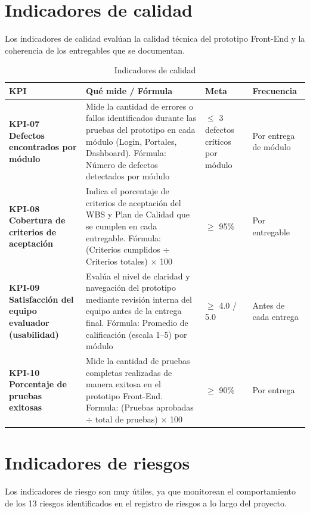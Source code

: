 \documentclass[11pt,spanish]{article}
\begin{document}
\section{Indicadores de calidad}

Los indicadores de calidad evalúan la calidad técnica del prototipo Front-End y la coherencia de los entregables que se documentan.

\begin{table}[H]
\centering
\small
\caption{Indicadores de calidad}\label{tab:indicadores-calidad}
\begin{tabularx}{\textwidth}{p{4.5cm} Y p{3cm} p{2.5cm}}
\toprule
\textbf{KPI} & \textbf{Qué mide / Fórmula} & \textbf{Meta} & \textbf{Frecuencia} \\
\midrule
\textbf{KPI-07 Defectos encontrados por módulo} & Mide la cantidad de errores o fallos identificados durante las pruebas del prototipo en cada módulo (Login, Portales, Dashboard). Fórmula: Número de defectos detectados por módulo & $\leq$ 3 defectos críticos por módulo & Por entrega de módulo \\
\textbf{KPI-08 Cobertura de criterios de aceptación} & Indica el porcentaje de criterios de aceptación del WBS y Plan de Calidad que se cumplen en cada entregable. Fórmula: (Criterios cumplidos $\div$ Criterios totales) $\times$ 100 & $\geq$ 95\% & Por entregable \\
\textbf{KPI-09 Satisfacción del equipo evaluador (usabilidad)} & Evalúa el nivel de claridad y navegación del prototipo mediante revisión interna del equipo antes de la entrega final. Fórmula: Promedio de calificación (escala 1--5) por módulo & $\geq$ 4.0 / 5.0 & Antes de cada entrega \\
\textbf{KPI-10 Porcentaje de pruebas exitosas} & Mide la cantidad de pruebas completas realizadas de manera exitosa en el prototipo Front-End. Formula: (Pruebas aprobadas $\div$ total de pruebas) $\times$ 100 & $\geq$ 90\% & Por entrega \\
\bottomrule
\end{tabularx}
\end{table}

\section{Indicadores de riesgos}

Los indicadores de riesgo son muy útiles, ya que monitorean el comportamiento de los 13 riesgos identificados en el registro de riesgos a lo largo del proyecto.
\end{document}
